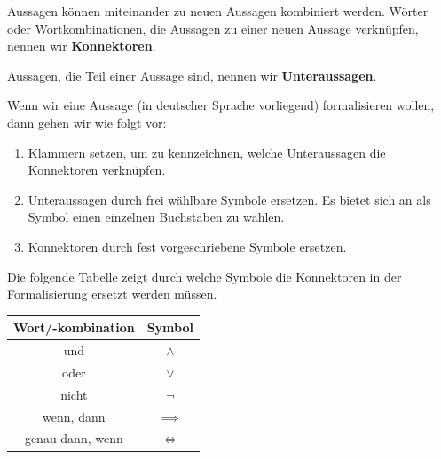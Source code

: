 \documentclass[../../main.tex]{subfiles}
\begin{document}
\begin{nutshell}

   Aussagen können miteinander zu neuen Aussagen kombiniert werden. Wörter oder Wortkombinationen, die Aussagen zu einer neuen Aussage verknüpfen, nennen wir \textbf{Konnektoren}.
   
   Aussagen, die Teil einer Aussage sind, nennen wir \textbf{Unteraussagen}.\bigskip
   
   Wenn wir eine Aussage (in deutscher Sprache vorliegend) formalisieren wollen, dann gehen wir wie folgt vor:
   \begin{enumerate}
       \item Klammern setzen, um zu kennzeichnen, welche Unteraussagen die Konnektoren verknüpfen.
       \item Unteraussagen durch frei wählbare Symbole ersetzen. Es bietet sich an als Symbol einen einzelnen Buchstaben zu wählen.
       \item Konnektoren durch fest vorgeschriebene Symbole ersetzen.
   \end{enumerate}
   
    Die folgende Tabelle zeigt durch welche Symbole die Konnektoren in der Formalisierung ersetzt werden müssen.
    
   \begin{center}
       \begin{tabular}{cc}\toprule
            Wort/-kombination & Symbol\\\midrule
            und &  $\land$\\
            oder&  $\lor$\\
            nicht & $\lnot$\\
            wenn, dann& $\implies$\\
            genau dann, wenn&  $\iff$\\\bottomrule
        \end{tabular}
    \end{center}
\end{nutshell}
    
\end{document}
